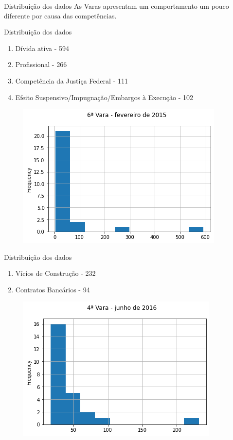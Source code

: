 \documentclass[10pt,t]{beamer}
\begin{document}
\begin{frame}{Distribuição dos dados}
	\vspace{80pt}
	As Varas apresentam um comportamento um pouco diferente por causa das competências.
\end{frame}

\begin{frame}{Distribuição dos dados}
	\begin{enumerate}
		\item Dívida ativa - 594
		\item Profissional - 266
		\item Competência da Justiça Federal - 111
		\item Efeito Suspensivo/Impugnação/Embargos à Execução - 102
	\end{enumerate}
	\begin{figure}
		\centering
		\includegraphics[scale=0.50]{./imagens/Vara_6_fevereiro_2015.png}
	\end{figure}
\end{frame}

\begin{frame}{Distribuição dos dados}
	\begin{enumerate}
		\item Vícios de Construção - 232
		\item Contratos Bancários - 94
	\end{enumerate}
	\begin{figure}
		\centering
		\includegraphics[scale=0.50]{./imagens/Vara_4_junho_2016.png}
	\end{figure}
\end{frame}
\end{document}
